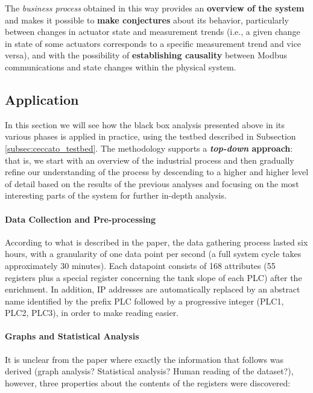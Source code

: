 The \textit{business process} obtained in this way provides an \textbf{overview of the system} and makes it possible to \textbf{make conjectures} about its behavior, particularly between changes in actuator state and measurement trends (i.e., a given change in state of some actuators corresponds to a specific measurement trend and vice versa), and with the possibility of \textbf{establishing causality} between Modbus communications and state changes within the physical system.

\subsection{Application}
\label{subsec:ceccato_application}
In this section we will see how the black box analysis presented above in its various phases is applied in practice, using the testbed described in Subsection \ref{subsec:ceccato_testbed}.
The methodology supports a \textbf{\textit{top-down} approach}: that is, we start with an overview of the industrial process and then gradually refine our understanding of the process by descending to a higher and higher level of detail based on the results of the previous analyses and focusing on the most interesting parts of the system for further in-depth analysis.

\paragraph{Data Collection and Pre-processing} 
According to what is described in the paper, the data gathering process lasted six hours, with a granularity of one data point per second (a full system cycle takes approximately 30 minutes). Each datapoint consists of 168 attributes (55 registers plus a special register concerning the tank slope of each PLC) after the enrichment. In addition, IP addresses are automatically replaced by an abstract name identified by the prefix PLC followed by a progressive integer (PLC1, PLC2, PLC3), in order to make reading easier.

\paragraph{Graphs and Statistical Analysis}
It is unclear from the paper where exactly the information that follows was derived (graph analysis? Statistical analysis? Human reading of the dataset?), however, three properties about the contents of the registers were discovered: 

